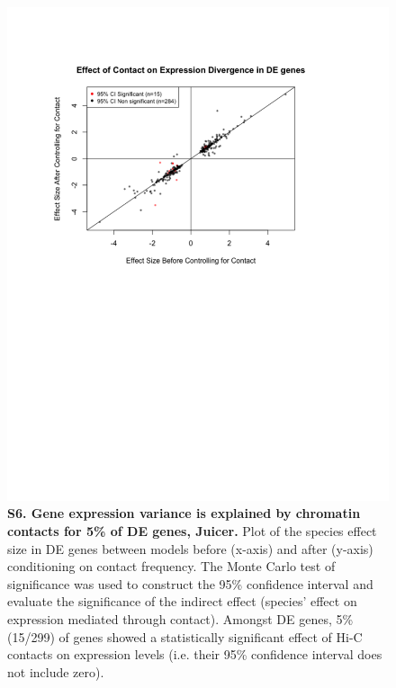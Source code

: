 \begin{figure}[!htb]
\centering
\includegraphics[width=6in]{img/figS6.pdf}
\caption[Gene expression variance is explained by chromatin contacts for 5\% of DE genes, Juicer.]{\textbf{S6. Gene expression variance is explained by chromatin contacts for 5\% of DE genes, Juicer.} Plot of the species effect size in DE genes between models before (x-axis) and after (y-axis) conditioning on contact frequency. The Monte Carlo test of significance was used to construct the 95\% confidence interval and evaluate the significance of the indirect effect (species' effect on expression mediated through contact). Amongst DE genes, 5\% (15/299) of genes showed a statistically significant effect of Hi-C contacts on expression levels (i.e. their 95\% confidence interval does not include zero).}
\label{fig:ch02-figS6}
\end{figure}

